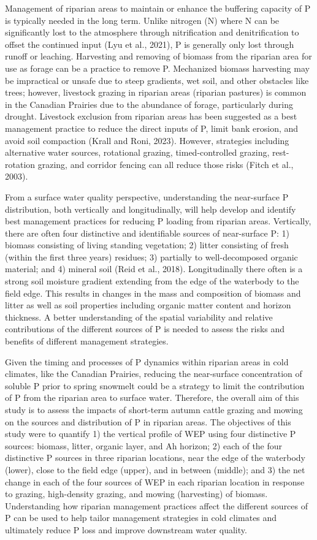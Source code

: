 \documentclass[
]{agujournal2019}
\begin{document}
Management of riparian areas to maintain or enhance the buffering
capacity of P is typically needed in the long term. Unlike nitrogen (N)
where N can be significantly lost to the atmosphere through
nitrification and denitrification to offset the continued input (Lyu et
al., 2021), P is generally only lost through runoff or leaching.
Harvesting and removing of biomass from the riparian area for use as
forage can be a practice to remove P. Mechanized biomass harvesting may
be impractical or unsafe due to steep gradients, wet soil, and other
obstacles like trees; however, livestock grazing in riparian areas
(riparian pastures) is common in the Canadian Prairies due to the
abundance of forage, particularly during drought. Livestock exclusion
from riparian areas has been suggested as a best management practice to
reduce the direct inputs of P, limit bank erosion, and avoid soil
compaction (Krall and Roni, 2023). However, strategies including
alternative water sources, rotational grazing, timed-controlled grazing,
rest-rotation grazing, and corridor fencing can all reduce those risks
(Fitch et al., 2003).

From a surface water quality perspective, understanding the near-surface
P distribution, both vertically and longitudinally, will help develop
and identify best management practices for reducing P loading from
riparian areas. Vertically, there are often four distinctive and
identifiable sources of near-surface P: 1) biomass consisting of living
standing vegetation; 2) litter consisting of fresh (within the first
three years) residues; 3) partially to well-decomposed organic material;
and 4) mineral soil (Reid et al., 2018). Longitudinally there often is a
strong soil moisture gradient extending from the edge of the waterbody
to the field edge. This results in changes in the mass and composition
of biomass and litter as well as soil properties including organic
matter content and horizon thickness. A better understanding of the
spatial variability and relative contributions of the different sources
of P is needed to assess the risks and benefits of different management
strategies.

Given the timing and processes of P dynamics within riparian areas in
cold climates, like the Canadian Prairies, reducing the near-surface
concentration of soluble P prior to spring snowmelt could be a strategy
to limit the contribution of P from the riparian area to surface water.
Therefore, the overall aim of this study is to assess the impacts of
short-term autumn cattle grazing and mowing on the sources and
distribution of P in riparian areas. The objectives of this study were
to quantify 1) the vertical profile of WEP using four distinctive P
sources: biomass, litter, organic layer, and Ah horizon; 2) each of the
four distinctive P sources in three riparian locations, near the edge of
the waterbody (lower), close to the field edge (upper), and in between
(middle); and 3) the net change in each of the four sources of WEP in
each riparian location in response to grazing, high-density grazing, and
mowing (harvesting) of biomass. Understanding how riparian management
practices affect the different sources of P can be used to help tailor
management strategies in cold climates and ultimately reduce P loss and
improve downstream water quality.
\end{document}
